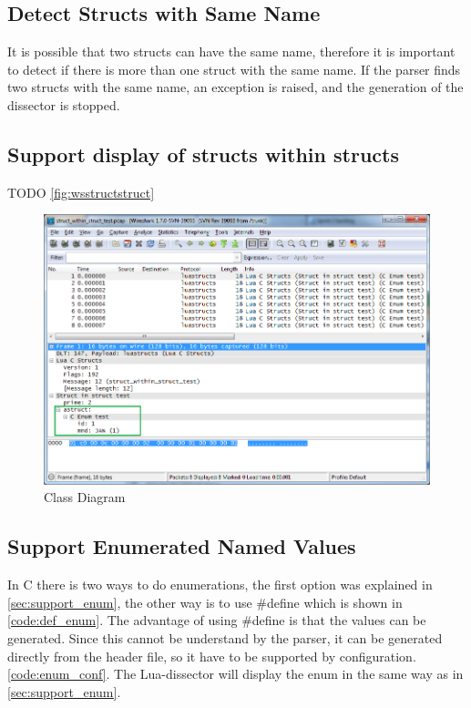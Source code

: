 

\subsection{Detect Structs with Same Name}
It is possible that two structs can have the same name, therefore it is 
important to detect if there is more than one struct with the same name. If 
the parser finds two structs with the same name, an exception is 
raised, and the generation of the dissector is stopped.

\subsection{Support display of structs within structs}
TODO \autoref{fig:wsstructstruct}

\begin{figure}[ht]
	\center
	\includegraphics[width=\textwidth]{./sprints/img/wireshark_structwithstruct}
	\caption{Class Diagram\label{fig:wsstructstruct}}
\end{figure}

\subsection{Support Enumerated Named Values}
In C there is two ways to do enumerations, the first option was explained in 
\autoref{sec:support_enum}, the other way is to use \#define which is shown in 
\autoref{code:def_enum}. The advantage of using \#define is  that the values 
can be generated. Since this cannot be understand by the parser, it can be generated directly from the header file, so it have to 
be supported by configuration. \autoref{code:enum_conf}. The Lua-dissector 
will display the enum in the same way as in \autoref{sec:support_enum}.

